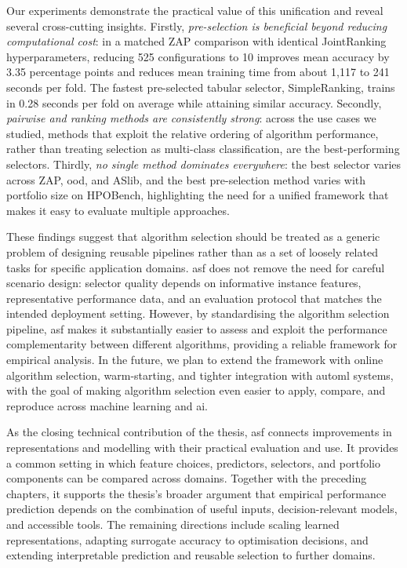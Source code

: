 Our experiments demonstrate the practical value of this unification and reveal several cross-cutting insights.
Firstly, \emph{pre-selection is beneficial beyond reducing computational cost}: in a matched ZAP comparison with identical JointRanking hyperparameters, reducing 525 configurations to 10 improves mean accuracy by 3.35 percentage points and reduces mean training time from about 1,117 to 241 seconds per fold. The fastest pre-selected tabular selector, SimpleRanking, trains in 0.28 seconds per fold on average while attaining similar accuracy.
Secondly, \emph{pairwise and ranking methods are consistently strong}: across the use cases we studied, methods that exploit the relative ordering of algorithm performance, rather than treating selection as multi-class classification, are the best-performing selectors.
Thirdly, \emph{no single method dominates everywhere}: the best selector varies across ZAP, \gls{ood}, and ASlib, and the best pre-selection method varies with portfolio size on HPOBench, highlighting the need for a unified framework that makes it easy to evaluate multiple approaches.

These findings suggest that algorithm selection should be treated as a generic problem of designing reusable pipelines rather than as a set of loosely related tasks for specific application domains.
\gls{asf} does not remove the need for careful scenario design: selector quality depends on informative instance features, representative performance data, and an evaluation protocol that matches the intended deployment setting. However, by standardising the algorithm selection pipeline, \gls{asf} makes it substantially easier to assess and exploit the performance complementarity between different algorithms, providing a reliable framework for empirical analysis.
In the future, we plan to extend the framework with online algorithm selection, warm-starting, and tighter integration with \gls{automl} systems, with the goal of making algorithm selection even easier to apply, compare, and reproduce across machine learning and \gls{ai}.

As the closing technical contribution of the thesis, \gls{asf} connects improvements in representations and modelling with their practical evaluation and use. It provides a common setting in which feature choices, predictors, selectors, and portfolio components can be compared across domains. Together with the preceding chapters, it supports the thesis's broader argument that empirical performance prediction depends on the combination of useful inputs, decision-relevant models, and accessible tools. The remaining directions include scaling learned representations, adapting surrogate accuracy to optimisation decisions, and extending interpretable prediction and reusable selection to further domains.
